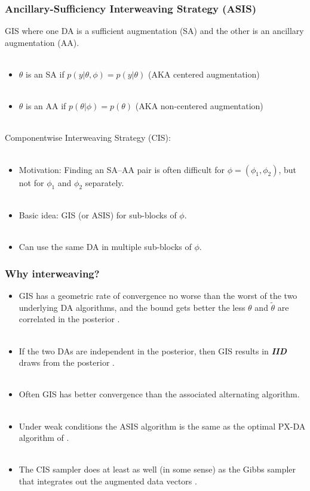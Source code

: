 \documentclass[xcolor=dvipsnames]{beamer}
\begin{document}
\begin{frame}
\frametitle{Ancillary-Sufficiency Interweaving Strategy (ASIS)}
GIS where one DA is a sufficient augmentation (SA) and the other is an ancillary augmentation (AA).\\~\\
\begin{itemize}
\item$\theta$ is an SA if $p(y|\theta,\phi)=p(y|\theta)$ (AKA centered augmentation)\\~\\
\item$\theta$ is an AA if $p(\theta|\phi)=p(\theta)$ (AKA non-centered augmentation)\\~\\
\end{itemize}
Componentwise Interweaving Strategy (CIS):\\~\\
\begin{itemize}
\item Motivation: Finding an SA--AA pair is often difficult for $\phi=(\phi_1,\phi_2)$, but not for $\phi_1$ and $\phi_2$ separately.\\~\\
\item Basic idea: GIS (or ASIS) for sub-blocks of $\phi$.\\~\\
\item Can use the same DA in multiple sub-blocks of $\phi$.
\end{itemize}
\end{frame}

\begin{frame}
\frametitle{Why interweaving?}
\begin{itemize}
  \item  GIS has a geometric rate of convergence no worse than the worst of the two underlying DA algorithms, and the bound gets better the less $\theta$ and $\tilde{\theta}$ are correlated in the posterior \citep{yu2011center}.\\~\\
  \item If the two DAs are independent in the posterior, then GIS results in {\color{blue}\textit{\textbf{IID}}} draws from the posterior \citep{yu2011center}. \\~\\
  \item Often GIS has better convergence than the associated alternating algorithm.\\~\\
  \item Under weak conditions the ASIS algorithm is the same as the optimal PX-DA algorithm of \citet{liu1999parameter} \citep{yu2011center}.\\~\\
  \item The CIS sampler does at least as well (in some sense) as the Gibbs sampler that integrates out the augmented data vectors \citep{yu2011center}.
  \end{itemize}
\end{frame}
\end{document}
